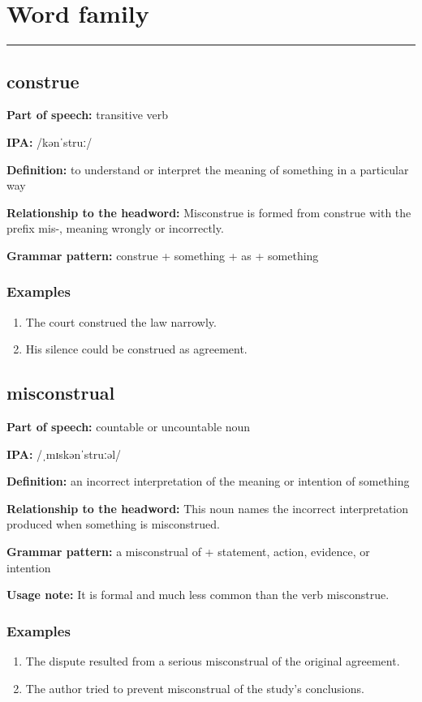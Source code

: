 \documentclass[11pt]{article}
\newcommand{\sectionrule}{\par\vspace{-0.5em}\noindent\textcolor{Accent}{\rule{\linewidth}{0.6pt}}\par}
\begin{document}
\section{Word family}
\sectionrule
\subsection{construe}
\textbf{Part of speech:} transitive verb

\textbf{IPA:} /kənˈstruː/

\textbf{Definition:} to understand or interpret the meaning of something in a particular way

\textbf{Relationship to the headword:} Misconstrue is formed from construe with the prefix mis-, meaning wrongly or incorrectly.

\textbf{Grammar pattern:} construe + something + as + something

\subsubsection{Examples}
\begin{enumerate}
  \item The court construed the law narrowly.
  \item His silence could be construed as agreement.
\end{enumerate}

\subsection{misconstrual}
\textbf{Part of speech:} countable or uncountable noun

\textbf{IPA:} /ˌmɪskənˈstruːəl/

\textbf{Definition:} an incorrect interpretation of the meaning or intention of something

\textbf{Relationship to the headword:} This noun names the incorrect interpretation produced when something is misconstrued.

\textbf{Grammar pattern:} a misconstrual of + statement, action, evidence, or intention

\textbf{Usage note:} It is formal and much less common than the verb misconstrue.

\subsubsection{Examples}
\begin{enumerate}
  \item The dispute resulted from a serious misconstrual of the original agreement.
  \item The author tried to prevent misconstrual of the study's conclusions.
\end{enumerate}
\end{document}
